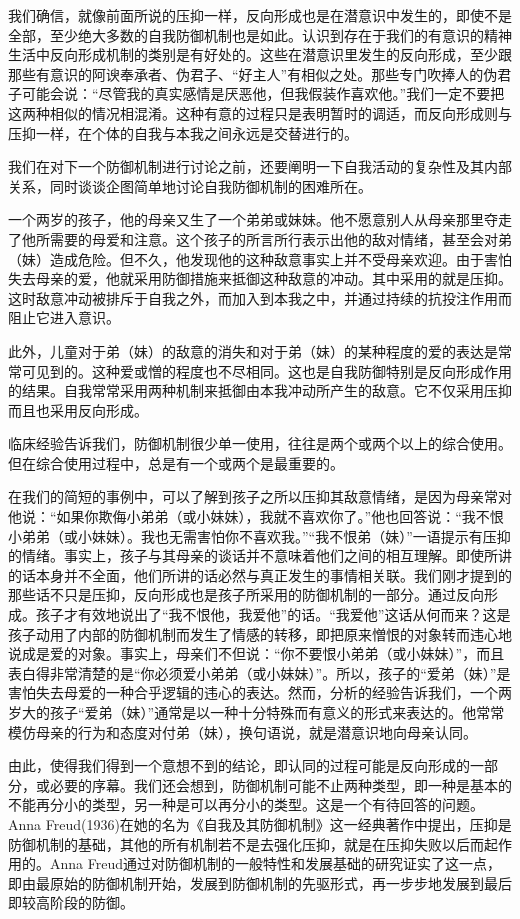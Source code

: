 \documentclass[UTF8,10pt,a4paper,openany]{book}
\begin{document}
我们确信，就像前面所说的压抑一样，反向形成也是在潜意识中发生的，即使不是全部，至少绝大多数的自我防御机制也是如此。认识到存在于我们的有意识的精神生活中反向形成机制的类别是有好处的。这些在潜意识里发生的反向形成，至少跟那些有意识的阿谀奉承者、伪君子、“好主人”有相似之处。那些专门吹捧人的伪君子可能会说：“尽管我的真实感情是厌恶他，但我假装作喜欢他。”我们一定不要把这两种相似的情况相混淆。这种有意的过程只是表明暂时的调适，而反向形成则与压抑一样，在个体的自我与本我之间永远是交替进行的。

我们在对下一个防御机制进行讨论之前，还要阐明一下自我活动的复杂性及其内部关系，同时谈谈企图简单地讨论自我防御机制的困难所在。

一个两岁的孩子，他的母亲又生了一个弟弟或妹妹。他不愿意别人从母亲那里夺走了他所需要的母爱和注意。这个孩子的所言所行表示出他的敌对情绪，甚至会对弟（妹）造成危险。但不久，他发现他的这种敌意事实上并不受母亲欢迎。由于害怕失去母亲的爱，他就采用防御措施来抵御这种敌意的冲动。其中采用的就是压抑。这时敌意冲动被排斥于自我之外，而加入到本我之中，并通过持续的抗投注作用而阻止它进入意识。

此外，儿童对于弟（妹）的敌意的消失和对于弟（妹）的某种程度的爱的表达是常常可见到的。这种爱或憎的程度也不尽相同。这也是自我防御特别是反向形成作用的结果。自我常常采用两种机制来抵御由本我冲动所产生的敌意。它不仅采用压抑而且也采用反向形成。

临床经验告诉我们，防御机制很少单一使用，往往是两个或两个以上的综合使用。但在综合使用过程中，总是有一个或两个是最重要的。

在我们的简短的事例中，可以了解到孩子之所以压抑其敌意情绪，是因为母亲常对他说：“如果你欺侮小弟弟（或小妹妹），我就不喜欢你了。”他也回答说：“我不恨小弟弟（或小妹妹）。我也无需害怕你不喜欢我。”“我不恨弟（妹）”一语提示有压抑的情绪。事实上，孩子与其母亲的谈话并不意味着他们之间的相互理解。即使所讲的话本身并不全面，他们所讲的话必然与真正发生的事情相关联。我们刚才提到的那些话不只是压抑，反向形成也是孩子所采用的防御机制的一部分。通过反向形成。孩子才有效地说出了“我不恨他，我爱他”的话。“我爱他”这话从何而来？这是孩子动用了内部的防御机制而发生了情感的转移，即把原来憎恨的对象转而违心地说成是爱的对象。事实上，母亲们不但说：“你不要恨小弟弟（或小妹妹）”，而且表白得非常清楚的是“你必须爱小弟弟（或小妹妹）”。所以，孩子的“爱弟（妹）”是害怕失去母爱的一种合乎逻辑的违心的表达。然而，分析的经验告诉我们，一个两岁大的孩子“爱弟（妹）”通常是以一种十分特殊而有意义的形式来表达的。他常常模仿母亲的行为和态度对付弟（妹），换句语说，就是潜意识地向母亲认同。

由此，使得我们得到一个意想不到的结论，即认同的过程可能是反向形成的一部分，或必要的序幕。我们还会想到，防御机制可能不止两种类型，即一种是基本的不能再分小的类型，另一种是可以再分小的类型。这是一个有待回答的问题。Anna Freud(1936)在她的名为《自我及其防御机制》这一经典著作中提出，压抑是防御机制的基础，其他的所有机制若不是去强化压抑，就是在压抑失败以后而起作用的。Anna Freud通过对防御机制的一般特性和发展基础的研究证实了这一点，即由最原始的防御机制开始，发展到防御机制的先驱形式，再一步步地发展到最后即较高阶段的防御。
\end{document}
